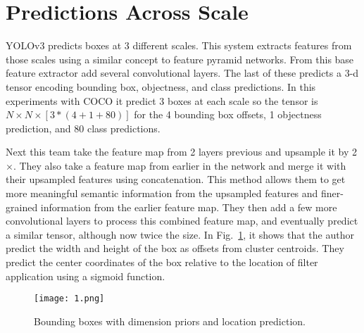 \documentclass[10pt,twocolumn,letterpaper]{article}
\begin{document}
\section{Predictions Across Scale}
YOLOv3 predicts boxes at 3 different scales. This system extracts features from those scales using a similar concept to feature pyramid networks. From this base feature extractor add several convolutional layers. The last of these predicts a 3-d tensor encoding bounding box, objectness, and class predictions. In this experiments with COCO \cite{Lin2014Microsoft} it predict 3 boxes at each scale so the tensor is $N\times N\times [3\ast(4+1+80)]$ for the 4 bounding box offsets, 1 objectness prediction, and 80 class predictions.	 
\par 
Next this team take the feature map from 2 layers previous and upsample it by 2$\times$. They also take a feature map from earlier in the network and merge it with their upsampled features using concatenation. This method allows them to get more meaningful semantic information from the upsampled features and finer-grained information from the earlier feature map. They then add a few more convolutional layers to process this combined feature map, and eventually predict a similar tensor, although now twice the size. In Fig.~\ref{1}, it shows that the author predict the width and height of the box as offsets
from cluster centroids. They predict the center coordinates of the box relative to the location of filter application using a sigmoid function.
\begin{figure}
	\begin{center}
		\texttt{[image: 1.png]}\\
		\caption{Bounding boxes with dimension priors and location prediction.}\label{1}
	\end{center}
\end{figure}
\par 
\end{document}

